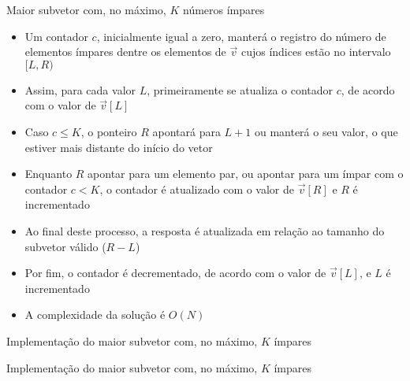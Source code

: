 \begin{frame}[fragile]{Maior subvetor com, no máximo, $K$ números ímpares}

    \begin{itemize}
        \item Um contador $c$, inicialmente igual a zero, manterá o registro do número de elementos
            ímpares dentre os elementos de $\vec{v}$ cujos índices estão no intervalo $[L, R)$

        \item Assim, para cada valor $L$, primeiramente se atualiza o contador $c$, de acordo
            com o valor de $\vec{v}[L]$

        \item Caso $c\leq K$, o ponteiro $R$ apontará para $L + 1$ ou manterá o seu valor, o que
            estiver mais distante do início do vetor

        \item Enquanto $R$ apontar para um elemento par, ou apontar para um ímpar com o contador
            $c < K$, o contador é atualizado com o valor de $\vec{v}[R]$ e $R$ é incrementado

        \item Ao final deste processo, a resposta é atualizada em relação ao tamanho do subvetor
            válido ($R - L$)

        \item Por fim, o contador é decrementado, de acordo com o valor de $\vec{v}[L]$, e $L$
            é incrementado

        \item A complexidade da solução é $O(N)$
    \end{itemize}

\end{frame}



\begin{frame}[fragile]{Implementação do maior subvetor com, no máximo, $K$ ímpares}
\end{frame}

\begin{frame}[fragile]{Implementação do maior subvetor com, no máximo, $K$ ímpares}
\end{frame}

